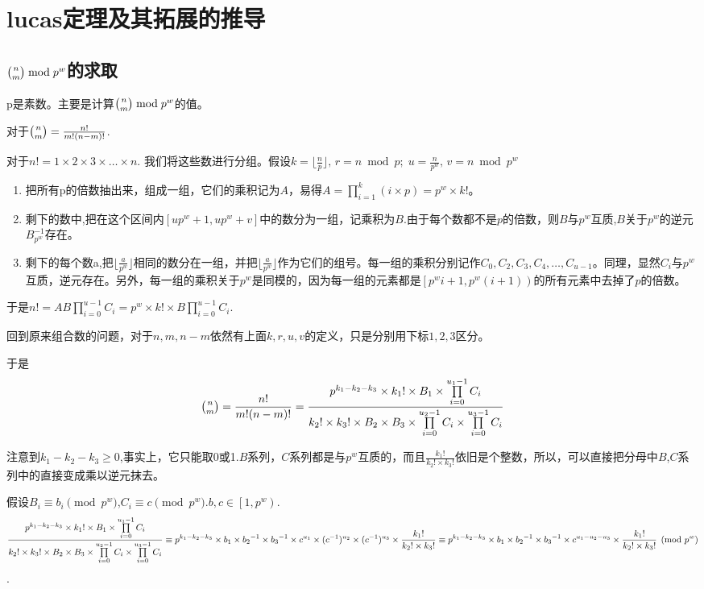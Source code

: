 \section{lucas定理及其拓展的推导}
\subsection{$\tbinom{n}{m} \bmod p^w$的求取}
\par p是素数。主要是计算$\tbinom{n}{m} \bmod p^w$的值。
\par 对于$\tbinom{n}{m} = \frac{n!}{m!(n-m)!}$.
\par 对于$n!=1 \times 2 \times 3 \times \ldots \times n.$
我们将这些数进行分组。假设$k=\lfloor \frac{n}{p} \rfloor,\, r = n \bmod p;\;u=\frac{n}{p^w},\, v=n \bmod {p^w}$
\begin{enumerate}
	\item 把所有p的倍数抽出来，组成一组，它们的乘积记为$A$，易得$A=\prod\limits_{i=1}^{k}(i \times p)=p^w \times k!$。
	\item 剩下的数中,把在这个区间内$[up^w+1,up^w+v]$中的数分为一组，记乘积为$B$.由于每个数都不是$p$的倍数，则$B$与$p^w$互质,$B$关于$p^w$的逆元$B_{p^w}^{-1}$存在。
	\item 剩下的每个数a,把$\lfloor \frac{a}{p^w} \rfloor$相同的数分在一组，并把$\lfloor \frac{a}{p^w} \rfloor$作为它们的组号。每一组的乘积分别记作$C_0,C_2,C_3,C_4,\ldots,C_{u-1}$。同理，显然$C_i$与$p^w$互质，逆元存在。另外，每一组的乘积关于$p^w$是同模的，因为每一组的元素都是$\left[p^wi+1,p^w(i+1)\right)$的所有元素中去掉了$p$的倍数。
\end{enumerate}
\par 于是$n!=AB\prod\limits_{i=0}^{u-1}C_i=p^w\times k! \times B\prod\limits_{i=0}^{u-1}C_i$.
\par 回到原来组合数的问题，对于$n,m,n-m$依然有上面$k,r,u,v$的定义，只是分别用下标$1,2,3$区分。
\par 于是$$\tbinom{n}{m} = \frac{n!}{m!(n-m)!} = \frac{p^{k_1-k_2-k_3}\times {k_1}! \times B_1 \times \prod\limits_{i=0}^{u_1-1}C_i}{{k_2}! \times {k_3}! \times B_2 \times B_3 \times \prod\limits_{i=0}^{u_2-1}C_i \times \prod\limits_{i=0}^{u_3-1}C_i}$$
\par 注意到$k_1-k_2-k_3 \geq 0$,事实上，它只能取0或1.$B$系列，$C$系列都是与$p^w$互质的，而且$\frac{{k_1}!}{{k_2}! \times {k_3}!}$依旧是个整数，所以，可以直接把分母中$B$,$C$系列中的直接变成乘以逆元抹去。
\par 假设$B_i \equiv b_i \pmod{p^w}$,$C_i \equiv c \pmod{p^w}$.$b,c \in \left[1,p^w\right)$.
$$\frac{p^{k_1-k_2-k_3}\times {k_1}! \times B_1 \times \prod\limits_{i=0}^{u_1-1}C_i}{{k_2}! \times {k_3}! \times B_2 \times B_3 \times \prod\limits_{i=0}^{u_2-1}C_i \times \prod\limits_{i=0}^{u_3-1}C_i} \\ \equiv {
	p^{k_1-k_2-k_3} \times b_1 \times {b_2}^{-1} \times {b_3}^{-1} 
	\times c^{u_1}  \times (c^{-1})^{u_2} \times (c^{-1})^{u_3} 
	\times \frac{{k_1}!}{{k_2}! \times {k_3}!}
}\\ \equiv
{
	p^{k_1-k_2-k_3} \times b_1 \times {b_2}^{-1} \times {b_3}^{-1} 
	\times c^{u_1-u_2-u_3} 
	\times \frac{{k_1}!}{{k_2}! \times {k_3}!}
} \pmod{p^w}$$.
